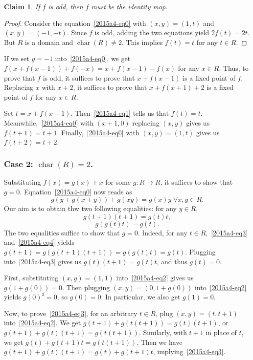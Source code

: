 \documentclass{article}
\DeclareMathOperator{\rchar}{char}
\newtheorem*{claim}{Claim}
\begin{document}
\begin{claim}
If $f$ is odd, then $f$ must be the identity map.
\end{claim}
\begin{proof}
Consider the equation~\eqref{2015a4-eq0} with $(x, y) = (1, t)$ and $(x, y) = (-1, -t)$.
Since $f$ is odd, adding the two equations yield $2 f(t) = 2t$.
But $R$ is a domain and $\rchar(R) \neq 2$.
This implies $f(t) = t$ for any $t \in R$.
\end{proof}

If we set $y = -1$ into~\eqref{2015a4-eq0}, we get $f(x + f(x - 1)) + f(-x) = x + f(x - 1) - f(x)$ for any $x \in R$.
Thus, to prove that $f$ is odd, it suffices to prove that $x + f(x - 1)$ is a fixed point of $f$.
Replacing $x$ with $x + 2$, it suffices to prove that $x + f(x + 1) + 2$ is a fixed point of $f$ for any $x \in R$.

Set $t = x + f(x + 1)$.
Then~\eqref{2015a4-eq1} tells us that $f(t) = t$.
Meanwhile,~\eqref{2015a4-eq0} with $(x + 1, 0)$ replacing $(x, y)$ gives us $f(t + 1) = t + 1$.
Finally,~\eqref{2015a4-eq0} with $(x, y) = (1, t)$ gives us $f(t + 2) = t + 2$.


\subsubsection*{Case 2: $\rchar(R) = 2$.}

Substituting $f(x) = g(x) + x$ for some $g : R \to R$, it suffices to show that $g = 0$.
Equation~\eqref{2015a4-eq0} now reads as
\[ g(y + g(x + y)) + g(xy) = g(x) y \; \forall x, y \in R. \tag{2}\label{2015a4-eq2} \]
Our aim is to obtain thw two following equalities: for any $y \in R$,
\[ g(t + 1) (t + 1) = g(t) t, \tag{3}\label{2015a4-eq3} \]
\[ g(g(t) t) = g(t). \tag{4}\label{2015a4-eq4} \]
The two equalities suffice to show that $g = 0$.
Indeed, for any $t \in R$,~\eqref{2015a4-eq3} and~\eqref{2015a4-eq4} yields $g(t + 1) = g(g(t + 1) (t + 1)) = g(g(t) t) = g(t)$.
Plugging into~\eqref{2015a4-eq3} gives us $g(t) (t + 1) = g(t) t$, and thus $g(t) = 0$.

First, substituting $(x, y) = (1, 1)$ into~\eqref{2015a4-eq2} gives us $g(1 + g(0)) = 0$.
Then plugging $(x, y) = (0, 1 + g(0))$ into~\eqref{2015a4-eq2} yields $g(0)^2 = 0$, so $g(0) = 0$.
In particular, we also get $g(1) = 0$.

Now, to prove~\eqref{2015a4-eq3}, for an arbitrary $t \in R$, plug $(x, y) = (t, t + 1)$ into~\eqref{2015a4-eq2}.
We get $g(t + 1) + g(t(t + 1)) = g(t) (t + 1)$, or $g(t + 1) + g(t) (t + 1) = g(t(t + 1))$.
Similarly, with $t + 1$ in place of $t$, we get $g(t) + g(t + 1) t = g(t(t + 1))$.
Then we have $g(t + 1) + g(t) (t + 1) = g(t) + g(t + 1) t$, implying~\eqref{2015a4-eq3}.
\end{document}
